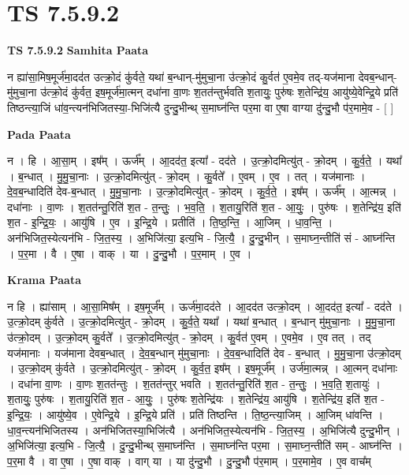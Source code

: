 \documentclass[17pt]{extarticle}
\begin{document}
\section{ TS 7.5.9.2 }

\textbf{TS 7.5.9.2 } \newline
\textbf{Samhita Paata} \newline

न ह्या॑सा॒मिष॒मूर्ज॑मा॒दद॑त उत्क्रो॒दं कु॑र्वते॒ यथा॑ ब॒न्धान्-मु॑मुचा॒ना उ॑त्क्रो॒दं कु॒र्वत॑ ए॒वमे॒व तद्-यज॑माना देवब॒न्धान्-मु॑मुचा॒ना उ॑त्क्रो॒दं कु॑र्वत॒ इष॒मूर्ज॑मा॒त्मन् दधा॑ना वा॒णः श॒तत॑न्तुर्भवति श॒तायुः॒ पुरु॑षः श॒तेन्द्रि॑य॒ आयु॑ष्ये॒वेन्द्रि॒ये प्रति॑ तिष्ठन्त्या॒जिं धा॑व॒न्त्यन॑भिजितस्या॒-भिजि॑त्यै दुन्दु॒भीन्थ् स॒माघ्न॑न्ति पर॒मा वा ए॒षा वाग्या दु॑न्दु॒भौ प॑र॒मामे॒व - [  ] \newline

\textbf{Pada Paata} \newline

न । हि । आ॒सा॒म् । इष᳚म् । ऊर्ज᳚म् । आ॒दद॑त॒ इत्या᳚ - दद॑ते । उ॒त्क्रो॒दमित्यु॑त् - क्रो॒दम् । कु॒र्व॒ते॒ । यथा᳚ । ब॒न्धात् । मु॒मु॒चा॒नाः । उ॒त्क्रो॒दमित्यु॑त् - क्रो॒दम् । कु॒र्वते᳚ । ए॒वम् । ए॒व । तत् । यज॑मानाः । दे॒व॒ब॒न्धादिति॑ देव-ब॒न्धात् । मु॒मु॒चा॒नाः । उ॒त्क्रो॒दमित्यु॑त् - क्रो॒दम् । कु॒र्व॒ते॒ । इष᳚म् । ऊर्ज᳚म् । आ॒त्मन्न् । दधा॑नाः । वा॒णः । श॒तत॑न्तु॒रिति॑ श॒त - त॒न्तुः॒ । भ॒व॒ति॒ । श॒तायु॒रिति॑ श॒त - आ॒युः॒ । पुरु॑षः । श॒तेन्द्रि॑य॒ इति॑ श॒त - इ॒न्द्रि॒यः॒ । आयु॑षि । ए॒व । इ॒न्द्रि॒ये । प्रतीति॑ । ति॒ष्ठ॒न्ति॒ । आ॒जिम् । धा॒व॒न्ति॒ । अन॑भिजित॒स्येत्यन॑भि - जि॒त॒स्य॒ । अ॒भिजि॑त्या॒ इत्य॒भि - जि॒त्यै॒ । दु॒न्दु॒भीन् । स॒माघ्न॒न्तीति॑ सं - आघ्न॑न्ति । प॒र॒मा । वै । ए॒षा । वाक् । या । दु॒न्दु॒भौ । प॒र॒माम् । ए॒व ।  \newline


\textbf{Krama Paata} \newline

न हि । ह्या॑साम् । आ॒सा॒मिष᳚म् । इष॒मूर्ज᳚म् । ऊर्ज॑मा॒दद॑ते । आ॒दद॑त उत्क्रो॒दम् । आ॒दद॑त॒ इत्या᳚ - दद॑ते । उ॒त्क्रो॒दम् कु॑र्वते । उ॒त्क्रो॒दमित्यु॑त् - क्रो॒दम् । कु॒र्व॒ते॒ यथा᳚ । यथा॑ ब॒न्धात् । ब॒न्धान् मु॑मुचा॒नाः । मु॒मु॒चा॒ना उ॑त्क्रो॒दम् । उ॒त्क्रो॒दम् कु॒र्वते᳚ । उ॒त्क्रो॒दमित्यु॑त् - क्रो॒दम् । कु॒र्वत॑ ए॒वम् । ए॒वमे॒व । ए॒व तत् । 
तद् यज॑मानाः । यज॑माना देवब॒न्धात् । दे॒व॒ब॒न्धान् मु॑मुचा॒नाः । दे॒व॒ब॒न्धादिति॑ देव - ब॒न्धात् । मु॒मु॒चा॒ना उ॑त्क्रो॒दम् । उ॒त्क्रो॒दम् कु॑र्वते । उ॒त्क्रो॒दमित्यु॑त् - क्रो॒दम् । कु॒र्व॒त॒ इष᳚म् । इष॒मूर्ज᳚म् । उर्ज॑मा॒त्मन्न् । आ॒त्मन् दधा॑नाः । दधा॑ना वा॒णः । वा॒णः श॒तत॑न्तुः । श॒तत॑न्तुर् भवति । श॒तत॑न्तु॒रिति॑ श॒त - त॒न्तुः॒ । भ॒व॒ति॒ श॒तायुः॑ । श॒तायुः॒ पुरु॑षः । श॒तायु॒रिति॑ श॒त - आ॒युः॒ । पुरु॑षः श॒तेन्द्रि॑यः । श॒तेन्द्रि॑य॒ आयु॑षि । श॒तेन्द्रि॑य॒ इति॑ श॒त - इ॒न्द्रि॒यः॒ । आयु॑ष्ये॒व । ए॒वेन्द्रि॒ये । इ॒न्द्रि॒ये प्रति॑ । प्रति॑ तिष्ठन्ति । ति॒ष्ठ॒न्त्या॒जिम् । आ॒जिम् धा॑वन्ति । धा॒व॒न्त्यन॑भिजितस्य । अन॑भिजितस्या॒भिजि॑त्यै । अन॑भिजित॒स्येत्यन॑भि - जि॒त॒स्य॒ । अ॒भिजि॑त्यै दुन्दु॒भीन् । अ॒भिजि॑त्या॒ इत्य॒भि - जि॒त्यै॒ । दु॒न्दु॒भीन्थ् स॒माघ्न॑न्ति । स॒माघ्न॑न्ति पर॒मा । स॒माघ्न॒न्तीति॑ सम् - आघ्न॑न्ति । प॒र॒मा वै । वा ए॒षा । ए॒षा वाक् । वाग् या । या दु॑न्दु॒भौ । दु॒न्दु॒भौ प॑र॒माम् । प॒र॒मामे॒व । ए॒व वाच᳚म् \newline
\end{document}
